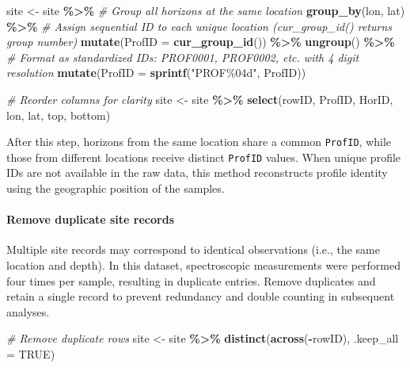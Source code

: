 \documentclass[
  10pt,
  b5paper,
  oneside]{book}
\newenvironment{Shaded}{\begin{snugshade}}{\end{snugshade}}
\newcommand{\AttributeTok}[1]{\textcolor[rgb]{0.13,0.29,0.53}{#1}}
\newcommand{\CommentTok}[1]{\textcolor[rgb]{0.56,0.35,0.01}{\textit{#1}}}
\newcommand{\ConstantTok}[1]{\textcolor[rgb]{0.56,0.35,0.01}{#1}}
\newcommand{\FunctionTok}[1]{\textcolor[rgb]{0.13,0.29,0.53}{\textbf{#1}}}
\newcommand{\NormalTok}[1]{#1}
\newcommand{\OtherTok}[1]{\textcolor[rgb]{0.56,0.35,0.01}{#1}}
\newcommand{\SpecialCharTok}[1]{\textcolor[rgb]{0.81,0.36,0.00}{\textbf{#1}}}
\newcommand{\StringTok}[1]{\textcolor[rgb]{0.31,0.60,0.02}{#1}}
\begin{document}
\begin{Shaded}
\begin{Highlighting}[]
\NormalTok{site }\OtherTok{\textless{}{-}}\NormalTok{ site }\SpecialCharTok{\%\textgreater{}\%}
  \CommentTok{\# Group all horizons at the same location}
  \FunctionTok{group\_by}\NormalTok{(lon, lat) }\SpecialCharTok{\%\textgreater{}\%}
  \CommentTok{\# Assign sequential ID to each unique location (cur\_group\_id() returns group number)}
  \FunctionTok{mutate}\NormalTok{(}\AttributeTok{ProfID =} \FunctionTok{cur\_group\_id}\NormalTok{()) }\SpecialCharTok{\%\textgreater{}\%}
  \FunctionTok{ungroup}\NormalTok{() }\SpecialCharTok{\%\textgreater{}\%}
  \CommentTok{\# Format as standardized IDs: PROF0001, PROF0002, etc. with 4 digit resolution}
  \FunctionTok{mutate}\NormalTok{(}\AttributeTok{ProfID =} \FunctionTok{sprintf}\NormalTok{(}\StringTok{"PROF\%04d"}\NormalTok{, ProfID))}

  \CommentTok{\# Reorder columns for clarity}
\NormalTok{site }\OtherTok{\textless{}{-}}\NormalTok{ site }\SpecialCharTok{\%\textgreater{}\%}
  \FunctionTok{select}\NormalTok{(rowID, ProfID, HorID, lon, lat, top, bottom)}
\end{Highlighting}
\end{Shaded}

After this step, horizons from the same location share a common \texttt{ProfID}, while those from different locations receive distinct \texttt{ProfID} values. When unique profile IDs are not available in the raw data, this method reconstructs profile identity using the geographic position of the samples.

\paragraph*{Remove duplicate site records}\label{remove-duplicate-site-records}

Multiple site records may correspond to identical observations (i.e., the same location and depth). In this dataset, spectroscopic measurements were performed four times per sample, resulting in duplicate entries. Remove duplicates and retain a single record to prevent redundancy and double counting in subsequent analyses.

\begin{Shaded}
\begin{Highlighting}[]
\CommentTok{\# Remove duplicate rows}
\NormalTok{site }\OtherTok{\textless{}{-}}\NormalTok{ site }\SpecialCharTok{\%\textgreater{}\%}
  \FunctionTok{distinct}\NormalTok{(}\FunctionTok{across}\NormalTok{(}\SpecialCharTok{{-}}\NormalTok{rowID), }\AttributeTok{.keep\_all =} \ConstantTok{TRUE}\NormalTok{)}
\end{Highlighting}
\end{Shaded}
\end{document}
